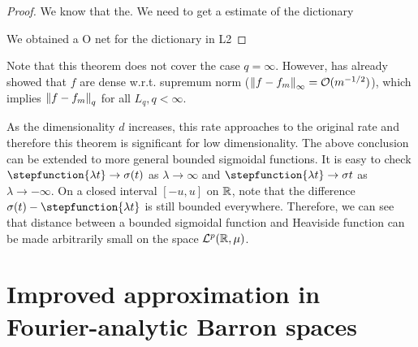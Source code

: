 
\begin{proof}
    We know that the. We need to get a estimate of the dictionary 

    We obtained a O net for the dictionary in L2 

\end{proof}

Note that this theorem does not cover the case $q = \infty$. However,
\cite{barronUniversalApproximationBounds1993} has already showed that $f$ are
dense w.r.t. supremum norm ($\left\| f - f_m \right\|_{\infty} = \mathcal{O}(m^{-1/2})$), which
implies $\left\| f-f_m \right\|_{q}$ for all $L_q, q<\infty$.

As the dimensionality $d$ increases, this rate approaches to the original rate
and therefore this theorem is significant for low dimensionality. The above
conclusion can be extended to more general bounded sigmoidal functions. It is
easy to check $\stepfunction{\lambda t} \to \sigma(t)$ as $\lambda \to \infty$
and $\stepfunction{\lambda t} \to \sigma{t}$ as $\lambda \to -\infty$. On a
closed interval $[-u, u]$ on $\mathbb{R}$, note that the difference $\sigma(t) -
\stepfunction{\lambda t}$ is still bounded everywhere. Therefore, we can see
that distance between a bounded sigmoidal function and Heaviside function can be
made arbitrarily small on the space $\mathcal{L}^{p}(\mathbb{R}, \mu)$.





\section{Improved approximation in Fourier-analytic Barron spaces}



